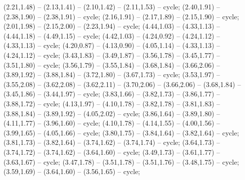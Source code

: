 { (2.21,1.48) -- (2.13,1.41) -- (2.10,1.42) -- (2.11,1.53) -- cycle;
 (2.40,1.91) -- (2.38,1.90) -- (2.38,1.91) -- cycle;
 (2.16,1.91) -- (2.17,1.89) -- (2.15,1.90) -- cycle;
 (2.01,1.98) -- (2.15,2.00) -- (2.23,1.94) -- cycle;
 (4.44,1.03) -- (4.33,1.13) -- (4.44,1.18) -- (4.49,1.15) -- cycle;
 (4.42,1.03) -- (4.24,0.92) -- (4.24,1.12) -- (4.33,1.13) -- cycle;
 (4.20,0.87) -- (4.13,0.90) -- (4.05,1.14) -- (4.33,1.13) -- (4.24,1.12) -- cycle;
 (3.43,1.83) -- (3.49,1.87) -- (3.56,1.78) -- (3.45,1.77) -- (3.51,1.80) -- cycle;
 (3.56,1.79) -- (3.55,1.84) -- (3.68,1.84) -- (3.66,2.06) -- (3.89,1.92) -- (3.88,1.84) -- (3.72,1.80) -- (3.67,1.73) -- cycle;
 (3.53,1.97) -- (3.55,2.08) -- (3.62,2.08) -- (3.62,2.11) -- (3.70,2.06) -- (3.66,2.06) -- (3.68,1.84) -- (3.45,1.86) -- (3.44,1.97) -- cycle;
 (3.83,1.66) -- (3.82,1.73) -- (3.86,1.77) -- (3.88,1.72) -- cycle;
 (4.13,1.97) -- (4.10,1.78) -- (3.82,1.78) -- (3.81,1.83) -- (3.88,1.84) -- (3.89,1.92) -- (4.05,2.02) -- cycle;
 (3.86,1.64) -- (3.89,1.80) -- (4.11,1.77) -- (3.96,1.60) -- cycle;
 (4.10,1.78) -- (4.14,1.55) -- (4.00,1.56) -- (3.99,1.65) -- (4.05,1.66) -- cycle;
 (3.80,1.75) -- (3.84,1.64) -- (3.82,1.64) -- cycle;
 (3.81,1.73) -- (3.82,1.64) -- (3.74,1.62) -- (3.74,1.74) -- cycle;
 (3.64,1.73) -- (3.74,1.72) -- (3.74,1.62) -- (3.64,1.60) -- cycle;
 (3.49,1.73) -- (3.61,1.77) -- (3.63,1.67) -- cycle;
 (3.47,1.78) -- (3.51,1.78) -- (3.51,1.76) -- (3.48,1.75) -- cycle;
 (3.59,1.69) -- (3.64,1.60) -- (3.56,1.65) -- cycle;
}
